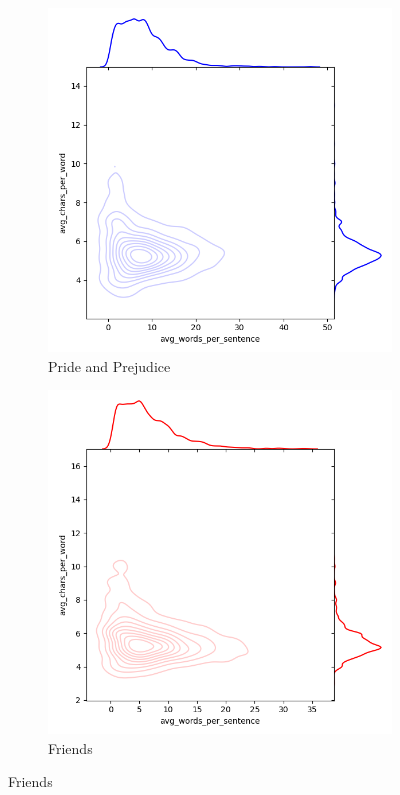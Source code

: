 \documentclass{article}
\begin{document}
\begin{titlepage}
\begin{figure}[H]
    \centering
    \caption{Selected KDE Plots}
    \begin{subfigure}[b]{0.45\textwidth}
        \centering
        \includegraphics[width=\textwidth]{images/3d_kde_test_0.png}
        \caption{Pride and Prejudice}
        \label{fig:subfig1}
    \end{subfigure}
    \hfill
    \begin{subfigure}[b]{0.45\textwidth}
        \centering
        \includegraphics[width=\textwidth]{images/3d_kde_test_1.png}
        \caption{Friends}
        \label{fig:subfig2}
    \end{subfigure}
    \label{fig:main}
\end{figure} 


\end{titlepage}
\end{document}
